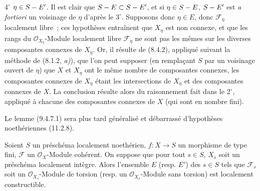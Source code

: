 $4^\circ$ $\eta\in S- E'$. Il est clair que $S- E\subset S- E'$, et si
$\eta\in S- E$, $S- E'$ est \emph{a fortiori} un voisinage de $\eta$ d'après le
$3^\circ$. Supposons donc $\eta\in E$, donc $\mathcal F_\eta$ localement
libre~; ces hypothèses entraînent que $X_\eta$ est non connexe, et que les
rangs du $\mathcal O_{X_\eta}$-Module localement libre $\mathcal F_\eta$ ne
sont pas les mêmes sur les diverses composantes connexes de $X_\eta$. Or, il
résulte de (8.4.2), appliqué suivant la méthode de (8.1.2, \emph{a)}), que l'on
peut supposer (en remplaçant $S$ par un voisinage ouvert de $\eta$) que $X$ et
$X_\eta$ ont le même nombre de composantes connexes, les composantes connexes
de $X_\eta$ étant les intersections de $X_\eta$ et des composantes connexes de
$X$. La conclusion résulte alors du raisonnement fait dans le $2^\circ$,
appliqué à chacune des composantes connexes de $X$ (qui sont en nombre fini).

\begin{remark}[9.4.7.2]
\label{IV.9.4.7.2-fr}
Le lemme (9.4.7.1) sera plus tard généralisé et débarrassé d'hypothèses
noethériennes (11.2.8).
\end{remark}

\begin{proposition}[9.4.8]
\label{IV.9.4.8-fr}
Soient $S$ un préschéma localement noethérien, $f:X\to S$ un morphisme de type
fini, $\mathcal F$ un $\mathcal O_X$-Module cohérent. On suppose que pour tout
$s\in S$, $X_s$ soit un préschéma localement intègre. Alors l'ensemble $E$
\textnormal{(resp.} $E'$\textnormal{)} des $s\in S$ tels que $\mathcal F_s$
soit un $\mathcal O_{X_s}$-Module de torsion \textnormal{(resp.} un
$\mathcal O_{X_s}$-Module sans torsion\textnormal{)} est localement
constructible.
\end{proposition}

